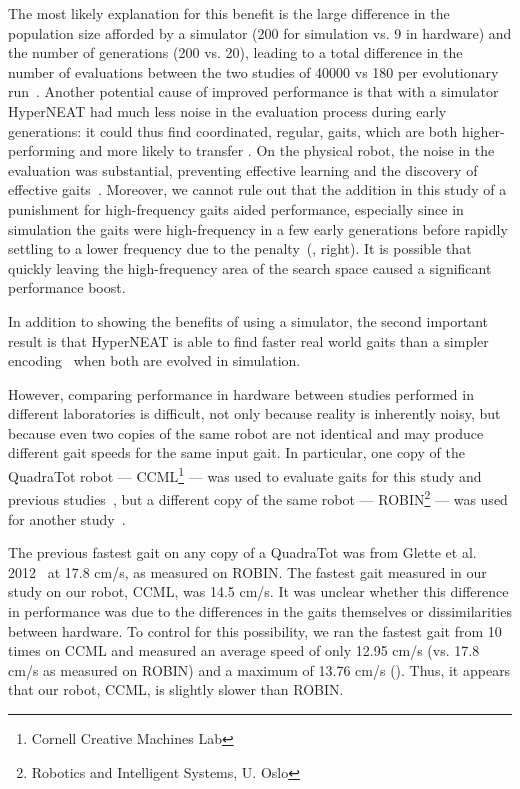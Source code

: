 The most likely explanation for this benefit is the large difference
in the population size afforded by a simulator (200 for simulation
vs. 9 in hardware) and the number of generations (200 vs. 20), leading
to a total difference in the number of evaluations between the two
studies of 40000 vs 180 per evolutionary run~\cite{yos:clune}. Another
potential cause of improved performance is that with a simulator
HyperNEAT had much less noise in the evaluation process during early
generations: it could thus find coordinated, regular, gaits, which are
both higher-performing and more likely to transfer . On the physical
robot, the noise in the evaluation was substantial, preventing
effective learning and the discovery of effective
gaits~\cite{yos:clune}. Moreover, we cannot rule out that the
addition in this study of a punishment for high-frequency gaits aided
performance, especially since in simulation the gaits were
high-frequency in a few early generations before rapidly settling to a
lower frequency due to the penalty~(,
right). It is possible that quickly leaving the high-frequency area of
the search space caused a significant performance boost.

In addition to showing the benefits of using a simulator, the second
important result is that HyperNEAT is able to find faster real world gaits
than a simpler encoding~\cite{glette} when both are evolved in simulation.

However, comparing performance in hardware between studies performed in
different laboratories is difficult, not only because reality is
inherently noisy, but because even two copies of the same robot are
not identical and may produce different gait speeds for the same input
gait. In particular, one copy of the QuadraTot robot ---
CCML\footnote{Cornell Creative Machines Lab} --- was used to evaluate
gaits for this study and previous studies~\cite{yos:clune,haocheng},
but a different copy of the same robot --- ROBIN\footnote{Robotics and
Intelligent Systems, U. Oslo} --- was used for another
study~\cite{glette}.

The previous fastest gait on any copy of a QuadraTot was from Glette
et al. 2012~\cite{glette} at 17.8 cm/s, as measured on ROBIN. The
fastest gait measured in our study on our robot, CCML, was 14.5
cm/s. It was unclear whether this difference in performance was due to
the differences in the gaits themselves or dissimilarities between
hardware. To control for this possibility, we ran the fastest gait
from \cite{glette} 10 times on CCML and measured an average speed of
only 12.95 cm/s (vs. 17.8 cm/s as measured on ROBIN) and a maximum of
13.76 cm/s (). Thus, it appears that our robot,
CCML, is slightly slower than ROBIN.

